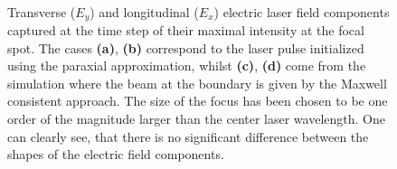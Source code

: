 \begin{figure}[h!]
	\centering
	\hspace{1mm}
	\\
	\hspace{1mm}
	\caption{Transverse ($ E_{y} $) and longitudinal ($ E_{x} $) electric laser field components captured at the time step of their maximal intensity at the focal spot. The cases \textbf{(a)}, \textbf{(b)} correspond to the laser pulse initialized using the paraxial approximation, whilst \textbf{(c)}, \textbf{(d)} come from the simulation where the beam at the boundary is given by the Maxwell consistent approach. The size of the focus has been chosen to be one order of the magnitude larger than the center laser wavelength. One can clearly see, that there is no significant difference between the shapes of the electric field components.}
	\label{fig:5}
\end{figure}

